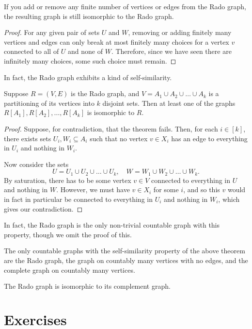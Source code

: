 \documentclass[nobib]{tufte-handout}
\begin{document}
\begin{corollary}
    If you add or remove any finite number of vertices or edges from the Rado graph, the resulting graph is still isomorphic to the Rado graph.

    \begin{proof}
        For any given pair of sets $U$ and $W$, removing or adding finitely many vertices and edges can only break at most finitely many choices for a vertex $v$ connected to all of $U$ and none of $W$. Therefore, since we have seen there are infinitely many choices, some such choice must remain.
    \end{proof}
\end{corollary}

In fact, the Rado graph exhibits a kind of self-similarity.

\begin{theorem}
    Suppose $R = (V,E)$ is the Rado graph, and $V = A_1 \cup A_2 \cup \ldots \cup A_k$ is a partitioning of its vertices into $k$ disjoint sets. Then at least one of the graphs $R[A_1], R[A_2], \ldots, R[A_k]$ is isomorphic to $R$.

    \begin{proof}
        Suppose, for contradiction, that the theorem fails. Then, for each $i \in [k]$, there exists sets $U_i, W_i \subseteq A_i$ such that no vertex $v \in X_i$ has an edge to everything in $U_i$ and nothing in $W_i$.

        Now consider the sets
        $$U = U_1 \cup U_2 \cup \ldots \cup U_k, \quad W = W_1 \cup W_2 \cup \ldots \cup W_k.$$
        By saturation, there has to be some vertex $v \in V$ connected to everything in $U$ and nothing in $W$. However, we must have $v \in X_i$ for some $i$, and so this $v$ would in fact in particular be connected to everything in $U_i$ and nothing in $W_i$, which gives our contradiction.
    \end{proof}
\end{theorem}

In fact, the Rado graph is the only non-trivial countable graph with this property, though we omit the proof of this.

\begin{proposition}
    The only countable graphs with the self-similarity property of the above theorem are the Rado graph, the graph on countably many vertices with no edges, and the complete graph on countably many vertices.
\end{proposition}

\begin{remark}
    The Rado graph is isomorphic to its complement graph.
\end{remark}

\section{Exercises}


%
%
\end{document}
